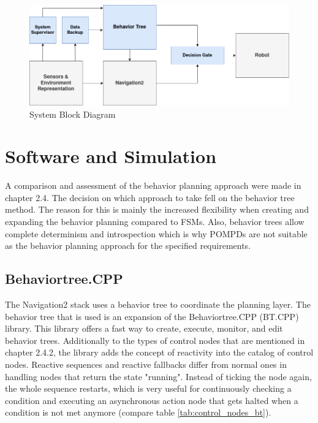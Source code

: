 \begin{center}
\begin{figure}[ht]   
	\includegraphics[width=1.0\textwidth]{images/block_diagram.png}
	\caption{System Block Diagram}
	\label{fig:block_diagram}
\end{figure}
\end{center}


\section{Software and Simulation}
A comparison and assessment of the behavior planning approach were made in chapter 2.4. The decision on which approach to take fell on the behavior tree method. The reason for this is mainly the increased flexibility when creating and expanding the behavior planning compared to FSMs. Also, behavior trees allow complete determinism and introspection which is why POMPDs are not suitable as the behavior planning approach for the specified requirements. 

\subsection{Behaviortree.CPP}
The Navigation2 stack uses a behavior tree to coordinate the planning layer. The behavior tree that is used is an expansion of the Behaviortree.CPP (BT.CPP) library. This library offers a fast way to create, execute, monitor, and edit behavior trees. 
Additionally to the types of control nodes that are mentioned in chapter 2.4.2, the library adds the concept of reactivity into the catalog of control nodes. Reactive sequences and reactive fallbacks differ from normal ones in handling nodes that return the state "running". Instead of ticking the node again, the whole sequence restarts, which is very useful for continuously checking a condition and executing an asynchronous action node that gets halted when a condition is not met anymore (compare table \ref{tab:control_nodes_bt}). 

